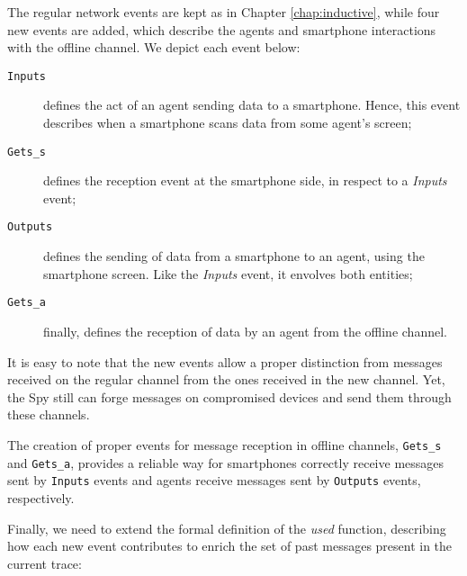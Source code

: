 The regular network events are kept as in Chapter \ref{chap:inductive}, while four new events are added, which describe the agents and smartphone interactions with the offline channel. We depict each event below:

\begin{description}
  \item[\texttt{Inputs}] defines the act of an agent sending data to a smartphone. Hence, this event describes when a smartphone scans data from some agent's screen;

  \item[\texttt{Gets\_s}] defines the reception event at the smartphone side, in respect to a \textit{Inputs} event;

  \item[\texttt{Outputs}] defines the sending of data from a smartphone to an agent, using the smartphone screen. Like the \textit{Inputs} event, it envolves both entities;

  \item[\texttt{Gets\_a}] finally, defines the reception of data by an agent from the offline channel.
\end{description}

It is easy to note that the new events allow a proper distinction from messages received on the regular channel from the ones received in the new channel. Yet, the Spy still can forge messages on compromised devices and send them through these channels.

The creation of proper events for message reception in offline channels, \texttt{Gets\_s} and \texttt{Gets\_a}, provides a reliable way for smartphones correctly receive messages sent by \texttt{Inputs} events and agents receive messages sent by \texttt{Outputs} events, respectively.

Finally, we need to extend the formal definition of the \textit{used} function, describing how each new event contributes to enrich the set of past messages present in the current trace:

